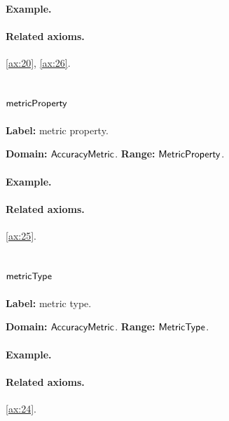 \paragraph{Example.}

\paragraph{Related axioms.} \eqref{ax:20}, \eqref{ax:26}.

\subsection{$\mathsf{metricProperty}$}
\label{sec:term-metricProperty}

\textbf{Label:} metric property.

\textbf{Domain:} $\mathsf{AccuracyMetric}$.
\textbf{Range:} $\mathsf{MetricProperty}$.

\paragraph{Example.}

\paragraph{Related axioms.} \eqref{ax:25}.

\subsection{$\mathsf{metricType}$}
\label{sec:term-metricType}

\textbf{Label:} metric type.

\textbf{Domain:} $\mathsf{AccuracyMetric}$.
\textbf{Range:} $\mathsf{MetricType}$.

\paragraph{Example.}

\paragraph{Related axioms.} \eqref{ax:24}.

